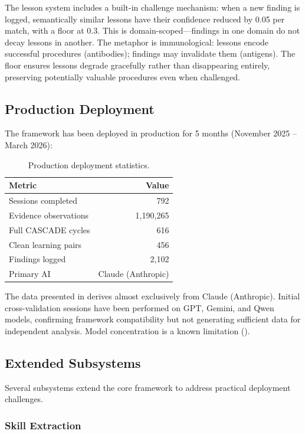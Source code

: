 The lesson system includes a built-in challenge mechanism: when a new finding is logged, semantically similar lessons have their confidence reduced by 0.05 per match, with a floor at 0.3. This is domain-scoped---findings in one domain do not decay lessons in another. The metaphor is immunological: lessons encode successful procedures (antibodies); findings may invalidate them (antigens). The floor ensures lessons degrade gracefully rather than disappearing entirely, preserving potentially valuable procedures even when challenged.

\subsection{Production Deployment}

The framework has been deployed in production for 5 months (November 2025 -- March 2026):

\begin{table}[h]
\centering
\begin{tabular}{lr}
\toprule
\textbf{Metric} & \textbf{Value} \\
\midrule
Sessions completed & 792 \\
Evidence observations & 1,190,265 \\
Full CASCADE cycles & 616 \\
Clean learning pairs & 456 \\
Findings logged & 2,102 \\
Primary AI & Claude (Anthropic) \\
\bottomrule
\end{tabular}
\caption{Production deployment statistics.}
\label{tab:deployment-stats}
\end{table}

The data presented in  derives almost exclusively from Claude (Anthropic). Initial cross-validation sessions have been performed on GPT, Gemini, and Qwen models, confirming framework compatibility but not generating sufficient data for independent analysis. Model concentration is a known limitation ().

\subsection{Extended Subsystems}

Several subsystems extend the core framework to address practical deployment challenges.

\subsubsection{Skill Extraction}

